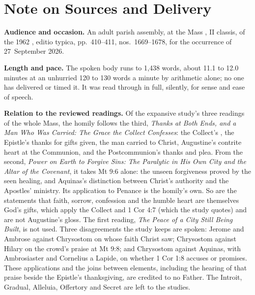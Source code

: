 
\section*{Note on Sources and Delivery}

{\footnotesize

\textbf{Audience and occasion.} An adult parish assembly, at the Mass
, II classis, of the 1962
, editio typica, pp.~410--411, nos.~1669--1678, for the
occurrence of 27~September 2026.

\textbf{Length and pace.} The spoken body runs to 1,438 words, about 11.1 to
12.0 minutes at an unhurried 120 to 130 words a minute by arithmetic alone; no
one has delivered or timed it. It was read through in full, silently, for
sense and ease of speech.

\textbf{Relation to the reviewed readings.} Of the expansive study's three
readings of the whole Mass, the homily follows the third, \textit{Thanks at Both Ends, and a Man Who Was Carried: The Grace the
Collect Confesses}: the Collect's , the Epistle's thanks for
gifts given, the man carried to Christ, Augustine's contrite heart at the
Communion, and the Postcommunion's thanks and plea. From the second,
\textit{Power on Earth to Forgive Sins: The Paralytic in His Own City and the
Altar of the Covenant}, it takes Mt 9:6 alone: the unseen forgiveness proved
by the seen healing, and Aquinas's distinction between Christ's authority and
the Apostles' ministry. Its application to Penance is the homily's own. So
are the statements that faith, sorrow, confession and the humble heart are
themselves God's gifts, which apply the Collect and 1 Cor 4:7 (which the study
quotes) and are not Augustine's gloss. The first reading,
\textit{The Peace of a City Still Being Built}, is not used. Three
disagreements the study keeps are spoken: Jerome and Ambrose against
Chrysostom on whose faith Christ saw; Chrysostom against Hilary on the crowd's
praise at Mt 9:8; and Chrysostom against Aquinas, with Ambrosiaster and
Cornelius a Lapide, on whether 1 Cor 1:8 accuses or promises. These
applications and the joins between elements, including the hearing of that
praise beside the Epistle's thanksgiving, are credited to no Father. The Introit,
Gradual, Alleluia, Offertory and Secret are left to the studies.

}
